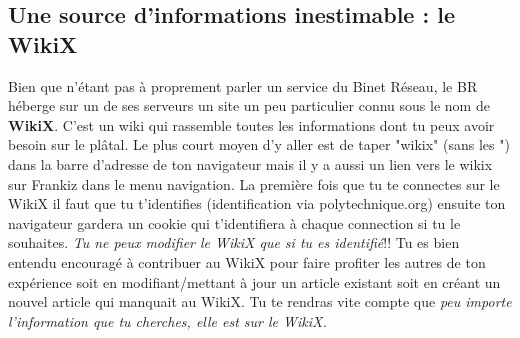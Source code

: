 
\subsection{Une source d'informations inestimable : le WikiX}
\label{WikiX}
Bien que n'\'etant pas \`a proprement parler un service du Binet R\'eseau, le BR h\'eberge sur un de ses serveurs un site un peu particulier connu sous le nom de \textbf{WikiX}. C'est un wiki qui rassemble toutes les informations dont tu peux avoir besoin sur le pl\^atal. Le plus court moyen d'y aller est de taper "wikix" (sans les ") dans la barre d'adresse de ton navigateur mais il y a aussi un lien vers le wikix sur Frankiz dans le menu navigation.
\newline
\newline
La premi\`ere fois que tu te connectes sur le WikiX il faut que tu t'identifies (identification via polytechnique.org) ensuite ton navigateur gardera un cookie qui t'identifiera \`a chaque connection si tu le souhaites. \emph{Tu ne peux modifier le WikiX que si tu es identifi\'e}!!
\newline
\newline
Tu es bien entendu encourag\'e \`a contribuer au WikiX pour faire profiter les autres de ton exp\'erience soit en modifiant/mettant \`a jour un article existant soit en cr\'eant un nouvel article qui manquait au WikiX.
\newline
\newline
Tu te rendras vite compte que \emph{peu importe l'information que tu cherches, elle est sur le WikiX.}
